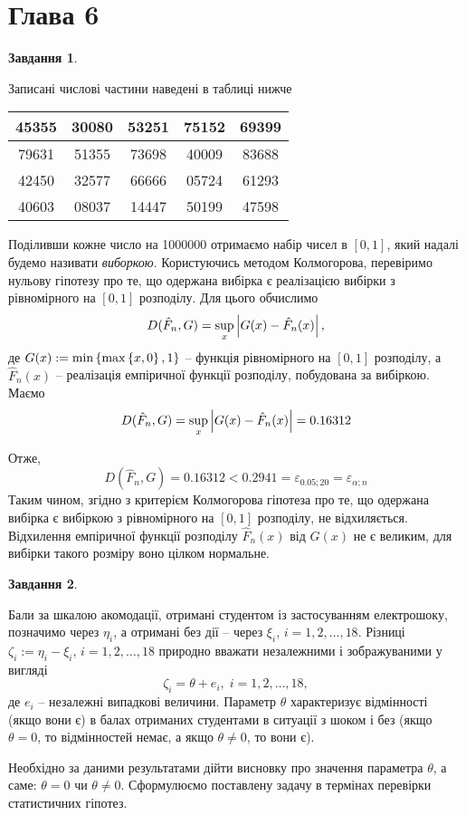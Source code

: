 \documentclass[12pt]{article} %
\newtheorem{prob}{Завдання}
\begin{document}
\section{Глава 6}
\setcounter{prob}{30}
\begin{prob}\end{prob}
Записані числові частини наведені в таблиці нижче
\begin{center}\begin{tabular}{|c|c|c|c|c|}
\hline
45355&30080&53251&75152&69399
\\\hline
79631&51355&73698&40009&83688
\\\hline
42450&32577&66666&05724&61293
\\\hline
40603&08037&14447&50199&47598
\\\hline
\end{tabular}\end{center}
Поділивши кожне число на 1000000 отримаємо набір чисел в $[0,1]$, який надалі будемо називати \textit{виборкою}. Користуючись методом
Колмогорова, перевіримо нульову гіпотезу про те, що одержана вибірка є реалізацією вибірки з рівномірного на $[0,1]$ розподілу. Для
цього обчислимо
\[D(\hat{F}_n,G)=\sup_x\myabs{G(x)-\hat{F}_n(x)},\]
де $G(x):=\min\mycbra{\max\mycbra{x,0},1}$ -- функція рівномірного на $[0,1]$ розподілу, а $\hat{F}_n(x)$ -- реалізація емпіричної
функції розподілу, побудована за вибіркою. Маємо
\[D(\hat{F}_n,G)=\sup_x\myabs{G(x)-\hat{F}_n(x)}=0.16312\]

Отже,
\[D(\hat{F}_n,G)=0.16312<0.2941=\varepsilon_{0.05;20}=\varepsilon_{\alpha;n}\]
Таким чином, згідно з критерієм Колмогорова гіпотеза про те, що одержана вибірка є вибіркою з рівномірного на $[0,1]$ розподілу,
не відхиляється. Відхилення емпіричної функції розподілу $\hat{F}_n(x)$ від $G(x)$ не є великим, для вибірки такого розміру воно
цілком нормальне.
\begin{prob}\end{prob}
	Бали за шкалою акомодації, отримані студентом із застосуванням електрошоку, позначимо через $\eta_i$, а отримані без дії --
	через $\xi_i$, $i=1,2,\hdots,18$. Різниці $\zeta_i:=\eta_i-\xi_i$, $i=1,2,\hdots,18$ природно вважати незалежними
	і зображуваними у вигляді
	\[\zeta_i=\theta+e_i,\;i=1,2,\hdots,18,\]
	де $e_i$ -- незалежні випадкові величини. Параметр $\theta$ характеризує відмінності (якщо вони є) в балах отриманих 
	студентами в ситуації з шоком і без (якщо $\theta=0$, то відмінностей немає, а якщо $\theta\neq0$, то вони є).

	Необхідно за даними результатами дійти висновку про значення параметра $\theta$, а саме: $\theta=0$ чи $\theta\neq0$. 
	Сформулюємо поставлену задачу в термінах перевірки статистичних гіпотез.
\end{document}
